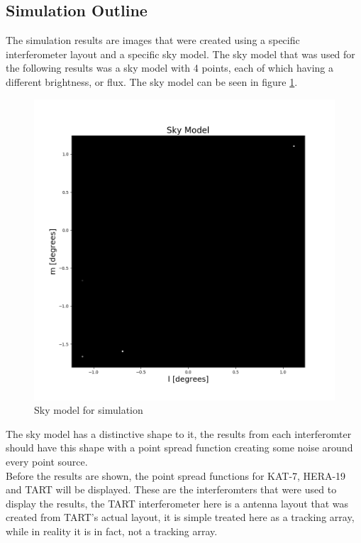\subsection{Simulation Outline}
The simulation results are images that were created using a specific interferometer layout and a specific sky model. The sky model that was used for the following results was a sky model with 4 points, each of which having a different brightness, or flux. The sky model can be seen in figure \ref{fig:Sky_model}.
\begin{figure}[H]
    \centering
    \includegraphics[scale=0.4]{images/4_POINT.png}
    \caption{Sky model for simulation}
    \label{fig:Sky_model}
\end{figure}
\begin{center}
\end{center}
The sky model has a distinctive shape to it, the results from each interferomter should have this shape with a point spread function creating some noise around every point source. \\
Before the results are shown, the point spread functions for KAT-7, HERA-19 and TART will be displayed. These are the interferomters that were used to display the results, the TART interferometer here is a antenna layout that was created from TART's actual layout, it is simple treated here as a tracking array, while in reality it is in fact, not a tracking array.

